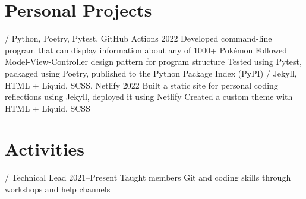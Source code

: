 \section{Personal Projects}
\begin{doutline}
    \1[Pokésummary] / Python, Poetry, Pytest, GitHub Actions \hfill 2022
        \2 Developed command-line program that can display information about any of 1000+ Pokémon
            \3 Followed Model-View-Controller design pattern for program structure
            \3 Tested using Pytest, packaged using Poetry, published to the Python Package Index (PyPI)
     / Jekyll, HTML + Liquid, SCSS, Netlify \hfill 2022
        \2 Built a static site for personal coding reflections using Jekyll, deployed it using Netlify
            \3 Created a custom theme with HTML + Liquid, SCSS
\end{doutline}

\section{Activities}
\begin{doutline}
     / Technical Lead \hfill 2021--Present
        \2 Taught members Git and coding skills through workshops and help channels
\end{doutline}

